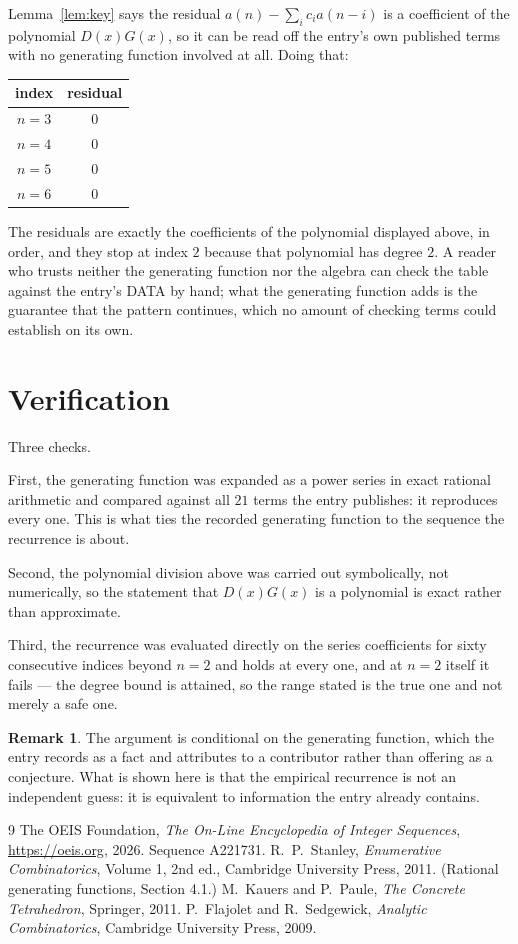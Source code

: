 \documentclass[11pt,a4paper]{article}
\theoremstyle{plain}
\theoremstyle{definition}
\newtheorem{remark}[theorem]{Remark}
\begin{document}
Lemma~\ref{lem:key} says the residual $a(n)-\sum_ic_ia(n-i)$ is a coefficient of the
polynomial $D(x)G(x)$, so it can be read off the entry's own published terms with no
generating function involved at all. Doing that:
\begin{center}
\begin{tabular}{cc}
index & residual \\ \hline
$n=3$ & $0$ \\
$n=4$ & $0$ \\
$n=5$ & $0$ \\
$n=6$ & $0$
\end{tabular}
\end{center}
The residuals are exactly the coefficients of the polynomial displayed above, in order, and
they stop at index $2$ because that polynomial has degree $2$. A reader who trusts
neither the generating function nor the algebra can check the table against the entry's DATA
by hand; what the generating function adds is the guarantee that the pattern continues, which
no amount of checking terms could establish on its own.

\section{Verification}

Three checks.

First, the generating function was expanded as a power series in exact rational arithmetic and
compared against all $21$ terms the entry publishes: it reproduces every one. This is
what ties the recorded generating function to the sequence the recurrence is about.

Second, the polynomial division above was carried out symbolically, not numerically, so the
statement that $D(x)G(x)$ is a polynomial is exact rather than approximate.

Third, the recurrence was evaluated directly on the series coefficients for sixty consecutive
indices beyond $n=2$ and holds at every one, and at $n=2$ itself it fails --- the
degree bound is attained, so the range stated is the true one and not merely a safe one.

\begin{remark}
The argument is conditional on the generating function, which the entry records as a fact and
attributes to a contributor rather than offering as a conjecture. What is shown here is that
the empirical recurrence is not an independent guess: it is equivalent to information the
entry already contains.
\end{remark}

\begin{thebibliography}{9}
 The OEIS Foundation, \emph{The On-Line Encyclopedia of Integer
Sequences}, \url{https://oeis.org}, 2026. Sequence A221731.
 R.~P.~Stanley, \emph{Enumerative Combinatorics}, Volume 1, 2nd ed.,
Cambridge University Press, 2011. (Rational generating functions, Section 4.1.)
 M.~Kauers and P.~Paule, \emph{The Concrete Tetrahedron}, Springer, 2011.
 P.~Flajolet and R.~Sedgewick, \emph{Analytic Combinatorics}, Cambridge
University Press, 2009.
\end{thebibliography}
\end{document}
